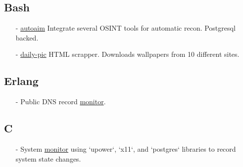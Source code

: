 \documentclass[11pt]{article}
\newcommand{\git}[2]{\href {https://github.com/azimut/#2} {#1}}
\begin{document}
\subsection{Bash}
\begin{itemize}
  \setlength{\parskip}{0pt}
  \setlength{\itemsep}{0pt plus 1pt}
\item[-] {\git{autoaim}{autoaim}} Integrate several OSINT tools for automatic recon. Postgresql backed.
\item[-] {\git{daily-pic}{daily-pic}} HTML scrapper. Downloads wallpapers from 10 different sites.
\end{itemize}

\subsection{Erlang}
\begin{itemize}
  \setlength{\parskip}{0pt}
  \setlength{\itemsep}{0pt plus 1pt}
\item[-] Public DNS record {\git{monitor}{snitch}}.
\end{itemize}

\subsection{C}
\begin{itemize}
  \setlength{\parskip}{0pt}
  \setlength{\itemsep}{0pt plus 1pt}
\item[-] System {\git{monitor}{sleeper}} using `upower`, `x11`, and `postgres` libraries to record system state changes.
\end{itemize}
\end{document}
